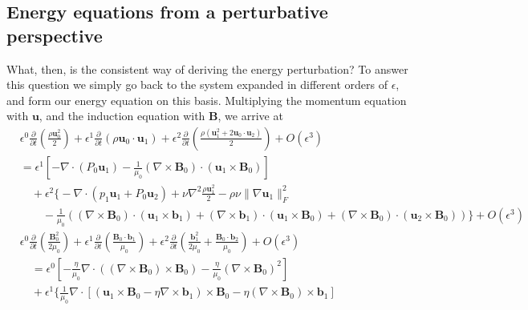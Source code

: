 \subsection{Energy equations from a perturbative perspective}

What, then, is the consistent way of deriving the energy perturbation? To answer this question we simply go back to the system expanded in different orders of $\epsilon$, and form our energy equation on this basis.
Multiplying the momentum equation with $\mathbf{u}$, and the induction equation with $\mathbf{B}$, we arrive at
%
\begin{equation}\label{eqn:energy-epsilon-expand}
\begin{aligned}    
    &\epsilon^0 \frac{\partial}{\partial t} \left(\frac{\rho \mathbf{u}_0^2}{2}\right) + \epsilon^1 \frac{\partial}{\partial t} \left(\rho \mathbf{u}_0\cdot \mathbf{u}_1\right) + \epsilon^2 \frac{\partial}{\partial t}\left(\frac{\rho (\mathbf{u}_1^2 + 2\mathbf{u}_0\cdot \mathbf{u}_2)}{2}\right) + O\left(\epsilon^3\right) \\
    &= \epsilon^1 \left[- \nabla\cdot(P_0\mathbf{u}_1) - \frac{1}{\mu_0} (\nabla\times \mathbf{B}_0)\cdot (\mathbf{u}_1\times \mathbf{B}_0)\right] \\
    &\quad + \epsilon^2 \bigg\{- \nabla \cdot (p_1\mathbf{u}_1 + P_0 \mathbf{u}_2) + \nu \nabla^2 \frac{\rho \mathbf{u}_1^2}{2} - \rho \nu \|\nabla \mathbf{u}_1\|_F^2 \\
    &\qquad - \frac{1}{\mu_0} \left((\nabla\times \mathbf{B}_0)\cdot (\mathbf{u}_1\times \mathbf{b}_1) + (\nabla\times \mathbf{b}_1)\cdot (\mathbf{u}_1\times \mathbf{B}_0) + (\nabla\times \mathbf{B}_0)\cdot (\mathbf{u}_2\times \mathbf{B}_0)\right) \bigg\} + O\left(\epsilon^3\right) \\ 
    &\epsilon^0 \frac{\partial}{\partial t} \left(\frac{\mathbf{B}_0^2}{2\mu_0}\right) + \epsilon^1 \frac{\partial}{\partial t}\left(\frac{\mathbf{B}_0\cdot \mathbf{b}_1}{\mu_0}\right) + \epsilon^2 \frac{\partial}{\partial t} \left(\frac{\mathbf{b}_1^2}{2\mu_0} + \frac{\mathbf{B}_0\cdot \mathbf{b}_2}{\mu_0}\right) + O\left(\epsilon^3\right) \\
    &\quad = \epsilon^0 \left[-\frac{\eta}{\mu_0} \nabla\cdot \left((\nabla\times \mathbf{B}_0) \times \mathbf{B}_0\right) - \frac{\eta}{\mu_0} (\nabla\times \mathbf{B}_0)^2\right] \\
    &\quad + \epsilon^1 \bigg\{\frac{1}{\mu_0}\nabla\cdot \left[(\mathbf{u}_1\times \mathbf{B}_0 - \eta \nabla\times \mathbf{b}_1)\times \mathbf{B}_0 - \eta (\nabla\times \mathbf{B}_0)\times \mathbf{b}_1\right] \\

\end{aligned}
\end{equation}
